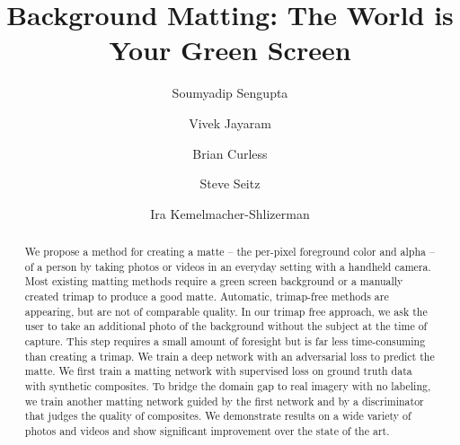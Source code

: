 \documentclass[10pt,twocolumn,letterpaper]{article}
\begin{document}
\title{Background Matting: The World is Your Green Screen}







\author{Soumyadip Sengupta}
\author{Vivek Jayaram}
\author{Brian Curless}
\author{Steve Seitz}
\author{Ira Kemelmacher-Shlizerman} 




\begin{abstract}
\vspace{-0.5em}
We propose a method for creating a matte -- the per-pixel foreground color and alpha -- of a person by taking photos or videos in an everyday setting with a handheld camera.  Most existing matting methods require a green screen background or a manually created trimap to produce a good matte.  Automatic, trimap-free methods are appearing, but are not of comparable quality.  In our trimap free approach, we ask the user to take an additional photo of the background without the subject at the time of capture.  This step requires a small amount of foresight but is far less time-consuming than creating a trimap.  We train a deep network with an adversarial loss to predict the matte.  We first train a matting network with supervised loss on ground truth data with synthetic composites.  To bridge the domain gap to real imagery with no labeling, we  train another matting network guided by the first network and by a discriminator that judges the quality of composites. We demonstrate results on a wide variety of photos and videos and show significant improvement over the state of the art. \end{abstract}
\end{document}
